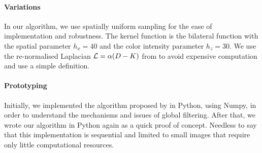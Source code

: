 \paragraph{Variations}
In our algorithm, we use spatially uniform sampling for the ease of implementation and robustness.
The kernel function is the bilateral function with the spatial parameter \(h_x = 40\) and the color intensity parameter \(h_z = 30\).
We use the re-normalised Laplacian \(\operatorname{\mathcal{L}} = \alpha (D-K)\) from \cite{milanfar_new_2016} to avoid expensive computation and use a simple definition.

\paragraph{Prototyping}
Initially, we implemented the algorithm proposed by \cite{glide_2014} in Python, using Numpy, in order to understand the mechanisms and issues of global filtering.
After that, we wrote our algorithm in Python again as a quick proof of concept.
Needless to say that this implementation is sequential and limited to small images that require only little computational resources.
